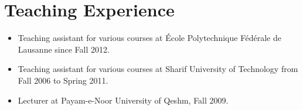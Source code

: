 \documentclass[a4paper]{article}
\theoremstyle{definition}
\begin{document}
\section{Teaching Experience}
\begin{itemize}
%
	 \item Teaching assistant for various courses at  \'{E}cole Polytechnique F\'{e}d\'{e}rale de Lausanne since Fall 2012.
	\item Teaching assistant for various courses at Sharif University of Technology from Fall 2006 to Spring 2011.
	\item Lecturer at Payam-e-Noor University of Qeshm, Fall 2009.
	
\end{itemize}
\end{document}
